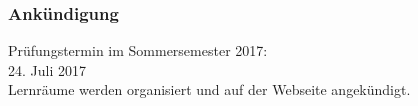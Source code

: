 \documentclass[onlymath]{beamer}
\begin{document}
\maketitle

\begin{frame}\frametitle{Ankündigung}

\begin{center}
Prüfungstermin im Sommersemester 2017:\\[3ex]

{\huge 24. Juli 2017}\\[3ex]

Lernräume werden organisiert und auf der Webseite angekündigt.
\end{center}

\end{frame}
\end{document}
